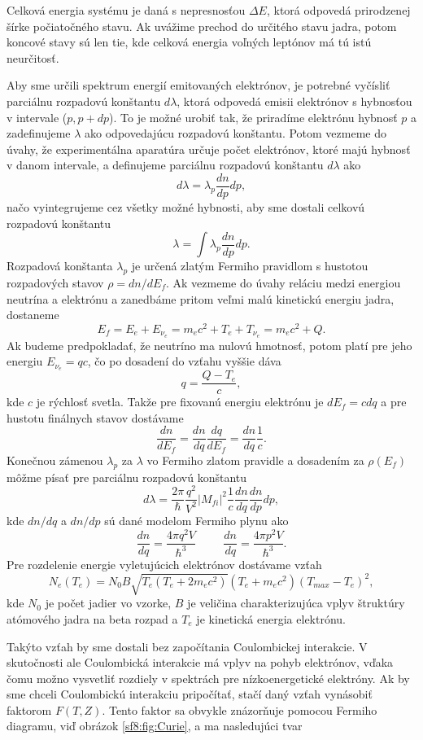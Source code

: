 \documentclass[../../main.tex]{subfiles}
\begin{document}
Celková energia systému je daná s nepresnosťou $\Delta E$, ktorá odpovedá prirodzenej šírke počiatočného stavu. Ak uvážime prechod do určitého stavu jadra, potom koncové stavy sú len tie, kde celková energia voľných leptónov má tú istú neurčitosť.

Aby sme určili spektrum energií emitovaných elektrónov, je potrebné vyčísliť parciálnu rozpadovú konštantu $d\lambda$, ktorá odpovedá emisii elektrónov s hybnosťou v intervale ($p,p+dp$). To je možné urobiť tak, že priradíme elektrónu hybnosť $p$ a zadefinujeme $\lambda$ ako odpovedajúcu rozpadovú konštantu. Potom vezmeme do úvahy, že experimentálna aparatúra určuje počet elektrónov, ktoré majú hybnosť v danom intervale, a definujeme parciálnu rozpadovú konštantu $d\lambda$ ako
$$ d\lambda = \lambda_p \frac{dn}{dp}dp, $$
načo vyintegrujeme cez všetky možné hybnosti, aby sme dostali celkovú rozpadovú konštantu
$$ \lambda = \int \lambda_p \frac{dn}{dp}dp. $$
Rozpadová konštanta $\lambda_p$ je určená zlatým Fermiho pravidlom s hustotou rozpadových stavov $\rho = dn/dE_{f}$. Ak vezmeme do úvahy reláciu medzi energiou neutrína a elektrónu a zanedbáme pritom veľmi malú kinetickú energiu jadra, dostaneme
$$ E_f = E_e + E_{\nu_e} = m_ec^2 + T_e +T_{\nu_e} = m_ec^2+Q.$$
Ak budeme predpokladať, že neutríno ma nulovú hmotnosť, potom platí pre jeho energiu $E_{\nu_e} = qc$, čo po dosadení do vzťahu vyššie dáva 
$$ q = \frac{Q-T_e}{c}, $$
kde $c$ je rýchlosť svetla. Takže pre fixovanú energiu elektrónu je $dE_f=cdq$ a pre hustotu finálnych stavov dostávame
$$ \frac{dn}{dE_f} = \frac{dn}{dq}\frac{dq}{dE_f} = \frac{dn}{dq}\frac{1}{c}.$$
Konečnou zámenou $\lambda_p$ za $\lambda$ vo Fermiho zlatom pravidle a dosadením za $\rho(E_f)$ môžme písať pre parciálnu rozpadovú konštantu
$$ d\lambda = \frac{2\pi}{\hbar} \frac{q^2}{V^2}\vert M_{fi} \vert^2 \frac{1}{c} \frac{dn}{dq} \frac{dn}{dp}dp, $$
kde $dn/dq$ a $dn/dp$ sú dané modelom Fermiho plynu ako 
$$ \frac{dn}{dq} = \frac{4\pi q^2 V}{\hbar^3} \hspace{1cm} \frac{dn}{dq} = \frac{4\pi p^2 V}{\hbar^3}.$$
 Pre rozdelenie energie vyletujúcich elektrónov dostávame vzťah
 $$ N_e(T_e) = N_0B\sqrt{T_e(T_e+2m_ec^2)}(T_e+m_ec^2)(T_{max}-T_e)^2, $$
kde $N_0$ je počet jadier vo vzorke, $B$ je veličina charakterizujúca vplyv štruktúry atómového jadra na beta rozpad a $T_e$ je kinetická energia elektrónu. 

Takýto vzťah by sme dostali bez započítania Coulombickej interakcie. V skutočnosti ale Coulombická interakcie má vplyv na pohyb elektrónov, vďaka čomu možno vysvetliť rozdiely v spektrách pre nízkoenergetické elektróny. Ak by sme chceli Coulombickú interakciu pripočítať, stačí daný vzťah vynásobiť faktorom $F(T,Z)$. Tento faktor sa obvykle znázorňuje pomocou Fermiho diagramu, viď obrázok \ref{sf8:fig:Curie}, a ma nasledujúci tvar
\end{document}
